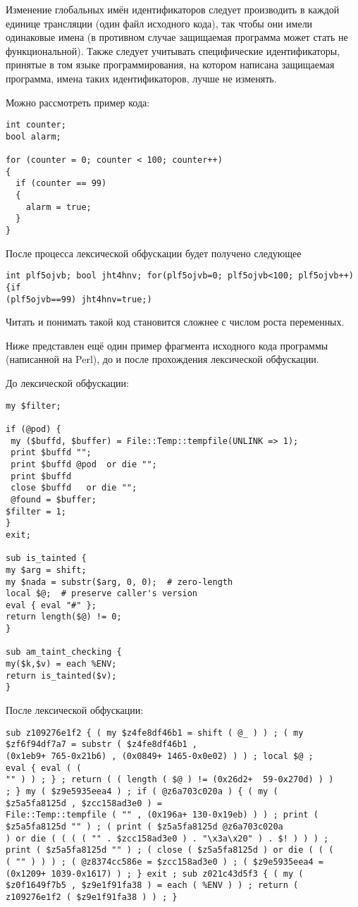 Изменение глобальных имён идентификаторов следует производить в каждой единице трансляции (один файл исходного кода), так чтобы они имели одинаковые имена (в противном случае защищаемая программа может стать не функциональной). Также следует учитывать специфические идентификаторы, принятые в том языке программирования, на котором написана защищаемая программа, имена таких идентификаторов, лучше не изменять.

Можно рассмотреть пример кода:

\begin{Verbatim}[frame=single]
int counter;
bool alarm;

for (counter = 0; counter < 100; counter++)
{
  if (counter == 99)
  {
    alarm = true;
  }
}
\end{Verbatim}

После процесса лексической обфускации будет получено следующее

\begin{Verbatim}[frame=single]
int plf5ojvb; bool jht4hnv; for(plf5ojvb=0; plf5ojvb<100; plf5ojvb++){if
(plf5ojvb==99) jht4hnv=true;)
\end{Verbatim}

Читать и понимать такой код становится сложнее с числом роста переменных.

Ниже представлен ещё один пример фрагмента исходного кода программы (написанной на Perl), до и после прохождения лексической обфускации.

До лексической обфускации: 

\begin{Verbatim}[frame=single]
my $filter; 

if (@pod) {
 my ($buffd, $buffer) = File::Temp::tempfile(UNLINK => 1);
 print $buffd "";
 print $buffd @pod	or die "";
 print $buffd 
 close $buffd	or die "";
 @found = $buffer;
$filter = 1;
}
exit;

sub is_tainted {
my $arg = shift;
my $nada = substr($arg, 0, 0);  # zero-length
local $@;  # preserve caller's version
eval { eval "#" };
return length($@) != 0;
}

sub am_taint_checking {
my($k,$v) = each %ENV;
return is_tainted($v);  
}
\end{Verbatim}

После лексической обфускации:

\begin{Verbatim}[frame=single]
sub z109276e1f2 { ( my $z4fe8df46b1 = shift ( @_ ) ) ; ( my      
$zf6f94df7a7 = substr ( $z4fe8df46b1 , 
(0x1eb9+ 765-0x21b6) , (0x0849+ 1465-0x0e02) ) ) ; local $@ ;
eval { eval ( ( 
"" ) ) ; } ; return ( ( length ( $@ ) != (0x26d2+  59-0x270d) ) )
; } my ( $z9e5935eea4 ) ; if ( @z6a703c020a ) { ( my (
$z5a5fa8125d , $zcc158ad3e0 ) = 
File::Temp::tempfile ( "" , (0x196a+ 130-0x19eb) ) ) ; print (
$z5a5fa8125d "" ) ; ( print ( $z5a5fa8125d @z6a703c020a 
) or die ( ( ( ( "" . $zcc158ad3e0 ) . "\x3a\x20" ) . $! ) ) ) ;
print ( $z5a5fa8125d "" ) ; ( close ( $z5a5fa8125d ) or die ( ( (
( "" ) ) ) ; ( @z8374cc586e = $zcc158ad3e0 ) ; ( $z9e5935eea4 = 
(0x1209+ 1039-0x1617) ) ; } exit ; sub z021c43d5f3 { ( my (
$z0f1649f7b5 , $z9e1f91fa38 ) = each ( %ENV ) ) ; return (
z109276e1f2 ( $z9e1f91fa38 ) ) ; }
\end{Verbatim}

